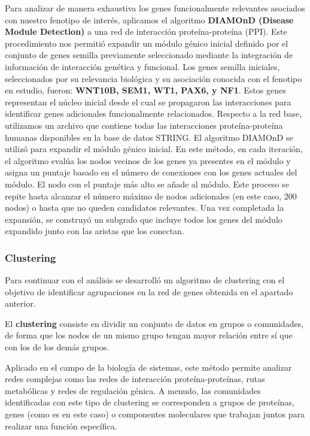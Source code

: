 Para analizar de manera exhaustiva los genes funcionalmente relevantes asociados con nuestro fenotipo de interés, aplicamos el algoritmo \textbf{DIAMOnD (Disease Module Detection)} a una red de interacción proteína-proteína (PPI). Este procedimiento nos permitió expandir un módulo génico inicial definido por el conjunto de genes semilla previamente seleccionado mediante la integración de información de interacción genética y funcional.
Los genes semilla iniciales, seleccionados por su relevancia biológica y su asociación conocida con el fenotipo en estudio, fueron: \textbf{WNT10B, SEM1, WT1, PAX6, y NF1}. Estos genes representan el núcleo inicial desde el cual se propagaron las interacciones para identificar genes adicionales funcionalmente relacionados.
Respecto a la red base, utilizamos un archivo que contiene todas las interacciones proteína-proteína humanas disponibles en la base de datos STRING.
El algoritmo DIAMOnD se utilizó para expandir el módulo génico inicial.  En este método, en cada iteración, el algoritmo evalúa los nodos vecinos de los genes ya presentes en el módulo y asigna un puntaje basado en el número de conexiones con los genes actuales del módulo. El nodo con el puntaje más alto se añade al módulo. Este proceso se repite hasta alcanzar el número máximo de nodos adicionales (en este caso, 200 nodos) o hasta que no queden candidatos relevantes. Una vez completada la expansión, se construyó un subgrafo que incluye todos los genes del módulo expandido junto con las aristas que los conectan.

\subsubsection{Clustering}


Para continuar con el análisis se desarrolló un algoritmo de clustering con el objetivo de identificar agrupaciones en la red de genes obtenida en el apartado anterior.


El \textbf{clustering} consiste en dividir un conjunto de datos en grupos o comunidades, de forma que los nodos de un mismo grupo tengan mayor relación entre sí que con los de los demás grupos.

Aplicado en el campo de la biología de sistemas, este método permite analizar redes complejas como las redes de interacción proteína-proteínas, rutas metabólicas y redes de regulación génica. A menudo, las comunidades identificadas con este tipo de clustering se corresponden a grupos de proteínas, genes (como es en este caso) o componentes moleculares que trabajan juntos para realizar una función específica.

